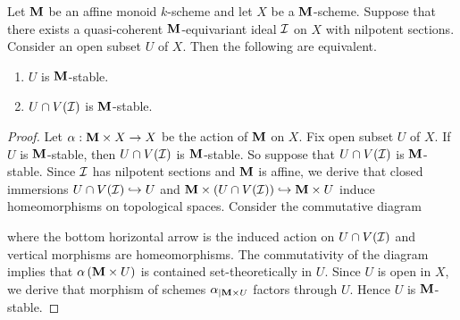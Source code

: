 \begin{proposition}\label{proposition:monoid_open_stable_correspondence}
Let $\mathbf{M}$ be an affine monoid $k$-scheme and let $X$ be a $\mathbf{M}$-scheme. Suppose that there exists a quasi-coherent $\mathbf{M}$-equivariant ideal ${\mathcal I}$ on $X$ with nilpotent sections. Consider an open subset $U$ of $X$. Then the following are equivalent.
\begin{enumerate}[label=\emph{\textbf{(\arabic*)}}, leftmargin=1.5em]
\item $U$ is $\mathbf{M}$-stable.
\item $U\cap V({\mathcal I})$ is $\mathbf{M}$-stable.
\end{enumerate}
\end{proposition}
\begin{proof}
Let $\alpha:\mathbf{M} \times X\rightarrow X$ be the action of $\mathbf{M}$ on $X$. Fix open subset $U$ of $X$. If $U$ is $\mathbf{M}$-stable, then $U\cap V({\mathcal I})$ is $\mathbf{M}$-stable. So suppose that $U\cap V({\mathcal I})$ is $\mathbf{M}$-stable. Since ${\mathcal I}$ has nilpotent sections and $\mathbf{M}$ is affine, we derive that closed immersions $U\cap V({\mathcal I})\hookrightarrow U$ and $\mathbf{M}\times \left(U\cap V({\mathcal I})\right) \hookrightarrow \mathbf{M}\times U$ induce homeomorphisms on topological spaces. Consider the commutative diagram
\begin{center}
\end{center}
where the bottom horizontal arrow is the induced action on $U\cap V({\mathcal I})$ and vertical morphisms are homeomorphisms. The commutativity of the diagram implies that $\alpha\left(\mathbf{M}\times U\right)$ is contained set-theoretically in $U$. Since $U$ is open in $X$, we derive that morphism of schemes $\alpha_{\mid \mathbf{M}\times U}$ factors through $U$. Hence $U$ is $\mathbf{M}$-stable.
\end{proof}

